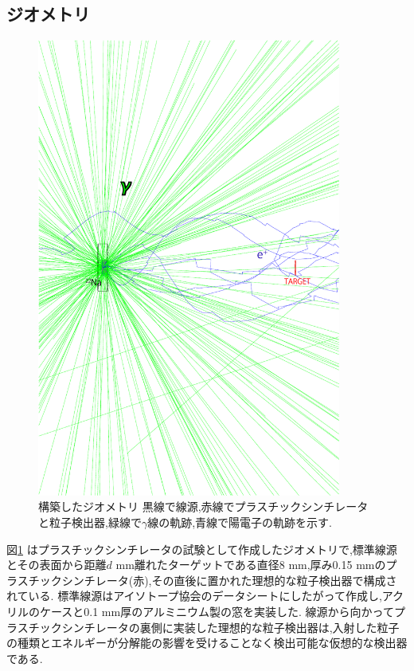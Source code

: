 \subsection{ジオメトリ}

\begin{figure}[!tbp]
	\centering
	\includegraphics[width=10cm]{img/test1_geometry.pdf}
	\caption[構築したジオメトリ]{構築したジオメトリ \newline 黒線で線源,赤線でプラスチックシンチレータと粒子検出器,緑線で$\gamma$線の軌跡,青線で陽電子の軌跡を示す.}
	\label{test1_geometry}
\end{figure}

図\ref{test1_geometry} はプラスチックシンチレータの試験として作成したジオメトリで,標準線源とその表面から距離$d$ mm離れたターゲットである直径8 mm,厚み0.15 mmのプラスチックシンチレータ(赤),その直後に置かれた理想的な粒子検出器で構成されている.
標準線源はアイソトープ協会のデータシートにしたがって作成し,アクリルのケースと0.1 mm厚のアルミニウム製の窓を実装した.
線源から向かってプラスチックシンチレータの裏側に実装した理想的な粒子検出器は,入射した粒子の種類とエネルギーが分解能の影響を受けることなく検出可能な仮想的な検出器である.

